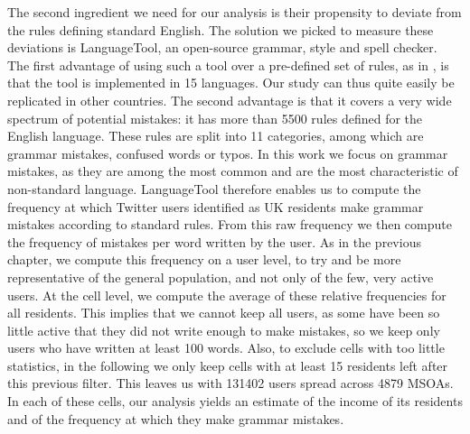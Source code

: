 \documentclass[../thesis.tex]{subfiles}
\begin{document}
The second ingredient we need for our analysis is their propensity to deviate from the
rules defining standard English. The solution we picked to measure these deviations is
LanguageTool, an open-source grammar, style and spell checker. The first advantage of
using such a tool over a pre-defined set of rules, as in
\cite{AbitbolSocioeconomicDependencies2018}, is that the tool is implemented in 15
languages. Our study can thus quite easily be replicated in other countries. The second
advantage is that it covers a very wide spectrum of potential mistakes: it has more than
\SI{5500}{} rules defined for the English language. These rules are split into 11
categories, among which are grammar mistakes, confused words or typos. In this work we
focus on grammar mistakes, as they are among the most common and are the most
characteristic of non-standard language. LanguageTool therefore enables us to compute
the frequency at which Twitter users identified as UK residents make grammar mistakes
according to standard rules. From this raw frequency we then compute the frequency of
mistakes per word written by the user. As in the previous chapter, we compute this
frequency on a user level, to try and be more representative of the general population,
and not only of the few, very active users. At the cell level, we compute the
average of these relative frequencies for all residents. This implies that we cannot
keep all users, as some have been so little active that they did not write enough to
make mistakes, so we keep only users who have written at least 100 words. Also, to
exclude cells with too little statistics, in the following we only keep cells with at
least 15 residents left after this previous filter. This leaves us with \SI{131402}{}
users spread across \SI{4879}{} \acp{MSOA}. In each of these cells, our analysis yields
an estimate of the income of its residents and of the frequency at which they make
grammar mistakes.
\end{document}
